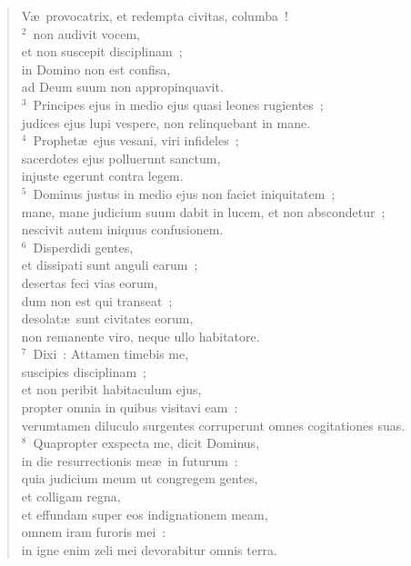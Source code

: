 \begin{flushleft}\begin{verse}\vspace{-19pt}V\ae\ provocatrix, et redempta civitas, columba~!\\
${}^{2}$~non audivit vocem,\\ et non suscepit disciplinam~;\\ in Domino non est confisa,\\ ad Deum suum non appropinquavit.\\
${}^{3}$~Principes ejus in medio ejus quasi leones rugientes~;\\ judices ejus lupi vespere, non relinquebant in mane.\\
${}^{4}$~Prophet\ae\ ejus vesani, viri infideles~;\\ sacerdotes ejus polluerunt sanctum,\\ injuste egerunt contra legem.\\
${}^{5}$~Dominus justus in medio ejus non faciet iniquitatem~;\\ mane, mane judicium suum dabit in lucem, et non abscondetur~;\\ nescivit autem iniquus confusionem.\\
${}^{6}$~Disperdidi gentes,\\ et dissipati sunt anguli earum~;\\ desertas feci vias eorum,\\ dum non est qui transeat~;\\ desolat\ae\ sunt civitates eorum,\\ non remanente viro, neque ullo habitatore.\\
${}^{7}$~Dixi~: Attamen timebis me,\\ suscipies disciplinam~;\\ et non peribit habitaculum ejus,\\ propter omnia in quibus visitavi eam~:\\ verumtamen diluculo surgentes corruperunt omnes cogitationes suas.\\
${}^{8}$~Quapropter exspecta me, dicit Dominus,\\ in die resurrectionis me\ae\ in futurum~:\\ quia judicium meum ut congregem gentes,\\ et colligam regna,\\ et effundam super eos indignationem meam,\\ omnem iram furoris mei~:\\ in igne enim zeli mei devorabitur omnis terra.\end{verse}\end{flushleft}


